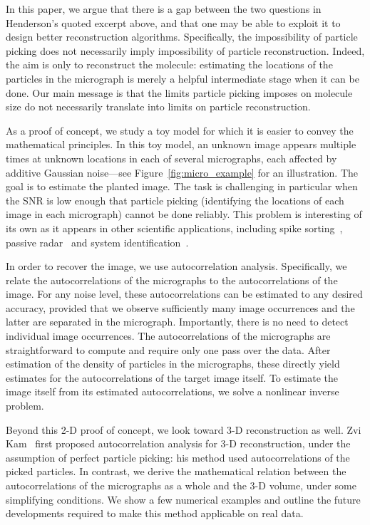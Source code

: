\documentclass[9pt,twocolumn,twoside,lineno]{pnas-new}
\begin{document}
In this paper, we argue that there is a gap between the two questions in Henderson's quoted excerpt above, and that one may be able to exploit it to design better reconstruction algorithms.
Specifically, the impossibility of particle picking does not necessarily imply impossibility of particle reconstruction.
Indeed, the aim is only to reconstruct the molecule: estimating the locations of the particles in the micrograph is merely a helpful intermediate stage when it can be done. Our main message is that the limits particle picking imposes on molecule size do not necessarily  translate into limits on particle reconstruction.

As a proof of concept, we study
a toy model for which it is easier to convey the mathematical principles. 
In this toy model, an unknown image appears multiple times at unknown locations in each of several micrographs, each affected by additive Gaussian noise---see Figure~\ref{fig:micro_example} for an illustration.
The goal is to estimate the planted image. The task is challenging in particular when the SNR is low enough that particle picking (identifying the locations of each image in each micrograph) cannot be done reliably. 
This problem is interesting of its own as it appears in other scientific applications, including spike sorting~\cite{lewicki1998review}, passive radar~\cite{gogineni2017passive} and system identification~\cite{ljung1998system}.
 
In order to recover the image, we use autocorrelation analysis. Specifically, we relate the autocorrelations of the micrographs to the autocorrelations of the image.
For any noise level, these autocorrelations can be estimated to any desired accuracy, provided that we  observe sufficiently many image occurrences and the latter are separated in the micrograph. Importantly, there is no need to detect individual image occurrences. The autocorrelations of the micrographs are straightforward to compute and require only one pass over the data. After estimation of the density of particles in the micrographs, these directly yield estimates for the autocorrelations of the target image itself. To estimate the image itself from its estimated autocorrelations, we solve a nonlinear inverse problem.

Beyond this 2-D proof of concept, we look toward \mbox{3-D} reconstruction as well. Zvi Kam~\cite{kam1980reconstruction} first proposed autocorrelation analysis for \mbox{3-D} reconstruction, under the assumption of perfect particle picking: his method used autocorrelations of the picked particles. In contrast, we derive the mathematical relation between the autocorrelations of the micrographs as a whole and the \mbox{3-D} volume, under some simplifying conditions.
We show a few numerical examples and outline the future developments required to make this method applicable on real data. 
\end{document}
